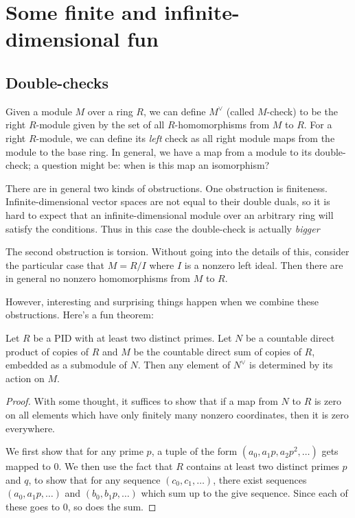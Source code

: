 \documentclass[a4paper]{amsart}
\begin{document}
\section{Some finite and infinite-dimensional fun}

\subsection{Double-checks}

Given a module $M$ over a ring $R$, we can define $M^\vee$ (called
$M$-check) to be the right $R$-module given by the set of all
$R$-homomorphisms from $M$ to $R$. For a right $R$-module, we can
define its {\em left} check as all right module maps from the module
to the base ring. In general, we have a map from a module to its
double-check; a question might be: when is this map an isomorphism?

There are in general two kinds of obstructions. One obstruction is
finiteness. Infinite-dimensional vector spaces are not equal to their
double duals, so it is hard to expect that an infinite-dimensional
module over an arbitrary ring will satisfy the conditions. Thus in
this case the double-check is actually {\em bigger}

The second obstruction is torsion. Without going into the details of
this, consider the particular case that $M = R/I$ where $I$ is a
nonzero left ideal. Then there are in general no nonzero homomorphisms
from $M$ to $R$.

However, interesting and surprising things happen when we combine
these obstructions. Here's a fun theorem:

\begin{theorem}
  Let $R$ be a PID with at least two distinct primes. Let $N$ be a
  countable direct product of copies of $R$ and $M$ be the countable
  direct sum of copies of $R$, embedded as a submodule of $N$. Then
  any element of $N^\vee$ is determined by its action on $M$.
\end{theorem}

\begin{proof}
  With some thought, it suffices to show that if a map from
  $N$ to $R$ is zero on all elements which have only finitely many
  nonzero coordinates, then it is zero everywhere.

  We first show that for any prime $p$, a tuple of the form $(a_0,
  a_1p, a_2p^2, \ldots)$ gets mapped to $0$. We then use the fact that
  $R$ contains at least two distinct primes $p$ and $q$, to show that
  for any sequence $(c_0, c_1, \ldots)$, there exist sequences $(a_0,
  a_1p, \ldots)$ and $(b_0, b_1p, \ldots)$ which sum up to the give sequence.
  Since each of these goes to $0$, so does the sum.
\end{proof}
\end{document}

